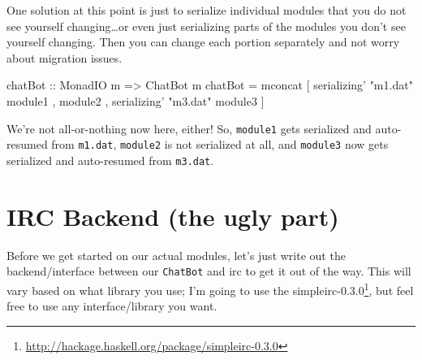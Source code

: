 \documentclass[]{article}
\newenvironment{Shaded}{}{}
\newcommand{\DataTypeTok}[1]{\textcolor[rgb]{0.56,0.13,0.00}{{#1}}}
\newcommand{\StringTok}[1]{\textcolor[rgb]{0.25,0.44,0.63}{{#1}}}
\newcommand{\OtherTok}[1]{\textcolor[rgb]{0.00,0.44,0.13}{{#1}}}
\newcommand{\FunctionTok}[1]{\textcolor[rgb]{0.02,0.16,0.49}{{#1}}}
\newcommand{\NormalTok}[1]{{#1}}
\renewcommand{\href}[2]{#2\footnote{\url{#1}}}
\begin{document}
One solution at this point is just to serialize individual modules that you do
not see yourself changing\ldots{}or even just serializing parts of the modules
you don't see yourself changing. Then you can change each portion separately and
not worry about migration issues.

\begin{Shaded}
\begin{Highlighting}[]
\OtherTok{chatBot ::} \DataTypeTok{MonadIO} \NormalTok{m }\OtherTok{=>} \DataTypeTok{ChatBot} \NormalTok{m}
\NormalTok{chatBot }\FunctionTok{=} \NormalTok{mconcat [ serializing' }\StringTok{"m1.dat"} \NormalTok{module1}
                  \NormalTok{, module2}
                  \NormalTok{, serializing' }\StringTok{"m3.dat"} \NormalTok{module3}
                  \NormalTok{]}
\end{Highlighting}
\end{Shaded}

We're not all-or-nothing now here, either! So, \texttt{module1} gets serialized
and auto-resumed from \texttt{m1.dat}, \texttt{module2} is not serialized at
all, and \texttt{module3} now gets serialized and auto-resumed from
\texttt{m3.dat}.

\section{IRC Backend (the ugly part)}\label{irc-backend-the-ugly-part}

Before we get started on our actual modules, let's just write out the
backend/interface between our \texttt{ChatBot} and irc to get it out of the way.
This will vary based on what library you use; I'm going to use the
\href{http://hackage.haskell.org/package/simpleirc-0.3.0}{simpleirc-0.3.0}, but
feel free to use any interface/library you want.
\end{document}
